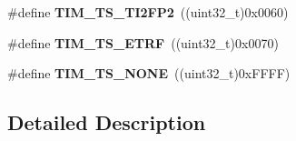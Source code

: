 \begin{DoxyCompactItemize}
\item 
\#define {\bfseries T\+I\+M\+\_\+\+T\+S\+\_\+\+T\+I2\+F\+P2}~((uint32\+\_\+t)0x0060)\hypertarget{group___t_i_m___trigger___selection_ga0ed58a269bccd3f22d19cc9a2ba3123f}{}\label{group___t_i_m___trigger___selection_ga0ed58a269bccd3f22d19cc9a2ba3123f}

\item 
\#define {\bfseries T\+I\+M\+\_\+\+T\+S\+\_\+\+E\+T\+RF}~((uint32\+\_\+t)0x0070)\hypertarget{group___t_i_m___trigger___selection_gaece08e02e056613a882aa7ff0a6ccc2d}{}\label{group___t_i_m___trigger___selection_gaece08e02e056613a882aa7ff0a6ccc2d}

\item 
\#define {\bfseries T\+I\+M\+\_\+\+T\+S\+\_\+\+N\+O\+NE}~((uint32\+\_\+t)0x\+F\+F\+F\+F)\hypertarget{group___t_i_m___trigger___selection_ga257bee9dc9f2f71a73124dd8c2329480}{}\label{group___t_i_m___trigger___selection_ga257bee9dc9f2f71a73124dd8c2329480}

\end{DoxyCompactItemize}


\subsection{Detailed Description}
